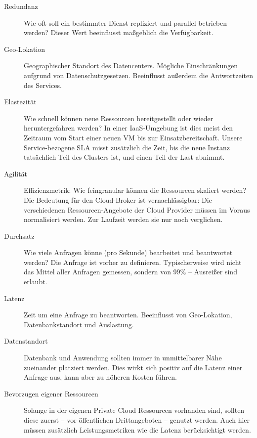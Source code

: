 \begin{description}
	

	\item[Redundanz] Wie oft soll ein bestimmter Dienst repliziert und parallel betrieben werden? Dieser Wert beeinflusst maßgeblich die Verfügbarkeit.

	
	\item[Geo-Lokation] Geographischer Standort des Datencenters. Mögliche Einschränkungen aufgrund von Datenschutzgesetzen. Beeinflusst außerdem die Antwortzeiten des Services.

	\item[Elastezität] Wie schnell können neue Ressourcen bereitgestellt oder wieder heruntergefahren werden? In einer IaaS-Umgebung ist dies meist den Zeitraum vom Start einer neuen VM bis zur Einsatzbereitschaft. Unsere Service-bezogene SLA misst zusätzlich die Zeit, bis die neue Instanz tatsächlich Teil des Clusters ist, und einen Teil der Last abnimmt.
	
	\item[Agilität] Effizienzmetrik: Wie feingranular können die Ressourcen skaliert werden? Die Bedeutung für den Cloud-Broker ist vernachlässigbar:  Die verschiedenen Ressourcen-Angebote der Cloud Provider müssen im Voraus normalisiert werden. Zur Laufzeit werden sie nur noch verglichen.
	
	\item[Durchsatz] Wie viele Anfragen könne (pro Sekunde) bearbeitet und beantwortet werden? Die Anfrage ist vorher zu definieren. Typischerweise wird nicht das Mittel aller Anfragen gemessen, sondern von 99\% -- Ausreißer sind erlaubt.
	
	\item[Latenz] Zeit um eine Anfrage zu beantworten. Beeinflusst von Geo-Lokation, Datenbankstandort und Auslastung.
	
	\item[Datenstandort] Datenbank und Anwendung sollten immer in unmittelbarer Nähe zueinander platziert werden. Dies wirkt sich positiv auf die Latenz einer Anfrage aus, kann aber zu höheren Kosten führen.
	
	\item[Bevorzugen eigener Ressourcen] Solange in der eigenen Private Cloud Ressourcen vorhanden sind, sollten diese zuerst -- vor öffentlichen Drittangeboten -- genutzt werden. Auch hier müssen zusätzlich Leistungsmetriken wie die Latenz berücksichtigt werden.
	

\end{description}
